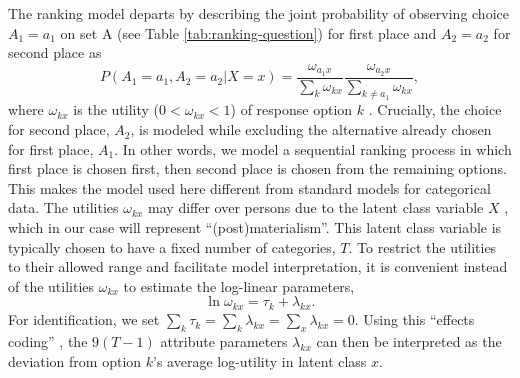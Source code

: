 \documentclass[letterpaper,12pt]{article}
\begin{document}
The ranking model departs by describing the joint probability of observing choice $A_1 = a_1$ on set A (see Table \ref{tab:ranking-question}) for first place  and $A_2 = a_2$ for second place as 
\begin{equation}
	P(A_1 = a_1, A_2 = a_2 | X = x) = 
		\frac{\omega_{a_1 x}}{\sum_{k} \omega_{k x}}
		\frac{\omega_{a_2 x}}{\sum_{k \neq a_1}
			\omega_{k x}},
				\label{eq:ranking}
\end{equation}
where $\omega_{k x}$ is the utility ($0<\omega_{k x}<1$) of response option $k$ \citep{mcfadden1974conditional}. Crucially, the choice for second place, $A_2$, is modeled while excluding the alternative already chosen for first place, $A_1$. In other words, we model a sequential ranking process in which first place is chosen first, then second place is chosen from the remaining options.
This makes the model used here different from standard models for categorical data.
 The utilities $\omega_{kx}$ may differ over persons due to the latent class variable $X$ \citep[pp. 171--3]{bockenholt2002comparison}, which in our case will represent ``(post)materialism''. This latent class variable is typically chosen to have a fixed number of categories, $T$. To restrict the utilities to their allowed range and facilitate model interpretation, it is convenient instead of the utilities $\omega_{kx}$ to estimate the log-linear parameters,
\begin{equation}
	\ln \omega_{k x} = \tau_{k} + \lambda_{k x}.\label{eq:loglin-measurement}
\end{equation}
For identification, we set $\sum_k \tau_{k} = \sum_{k} \lambda_{kx} = \sum_{x} \lambda_{kx} = 0$. Using this ``effects coding''  \citep{vermunt2013technical},  the $9 (T - 1)$ attribute parameters $\lambda_{k x}$ can then be interpreted as the deviation from option $k$'s average log-utility in latent class $x$.
\end{document}
